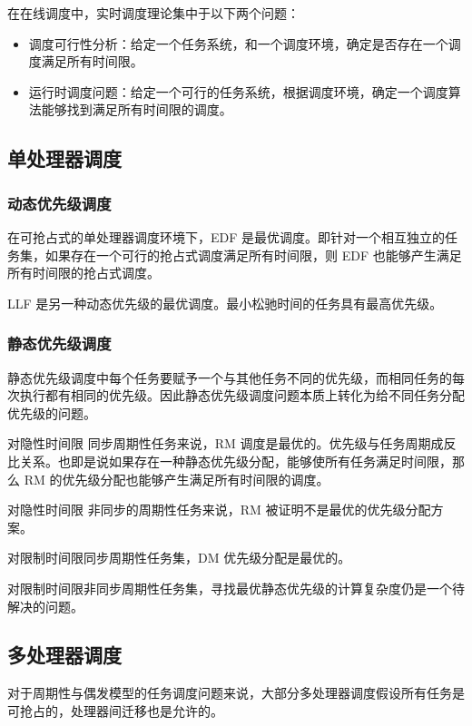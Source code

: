在在线调度中，实时调度理论集中于以下两个问题：
\begin{itemize}
  \item 调度可行性分析：给定一个任务系统，和一个调度环境，确定是否存在一个调度满足所有时间限。
  \item 运行时调度问题：给定一个可行的任务系统，根据调度环境，确定一个调度算法能够找到满足所有时间限的调度。
\end{itemize}

\subsection{单处理器调度}

\subsubsection{动态优先级调度}

在可抢占式的单处理器调度环境下，EDF 是最优调度。即针对一个相互独立的任务集，如果存在一个可行的抢占式调度满足所有时间限，则 EDF 也能够产生满足所有时间限的抢占式调度。

LLF 是另一种动态优先级的最优调度。最小松驰时间的任务具有最高优先级。


\subsubsection{静态优先级调度}

静态优先级调度中每个任务要赋予一个与其他任务不同的优先级，而相同任务的每次执行都有相同的优先级。因此静态优先级调度问题本质上转化为给不同任务分配优先级的问题。

对隐性时间限 同步周期性任务来说，RM 调度是最优的。优先级与任务周期成反比关系。也即是说如果存在一种静态优先级分配，能够使所有任务满足时间限，那么 RM 的优先级分配也能够产生满足所有时间限的调度。

对隐性时间限 非同步的周期性任务来说，RM 被证明不是最优的优先级分配方案。

对限制时间限同步周期性任务集，DM 优先级分配是最优的。

对限制时间限非同步周期性任务集，寻找最优静态优先级的计算复杂度仍是一个待解决的问题。

\subsection{多处理器调度}

对于周期性与偶发模型的任务调度问题来说，大部分多处理器调度假设所有任务是可抢占的，处理器间迁移也是允许的。

